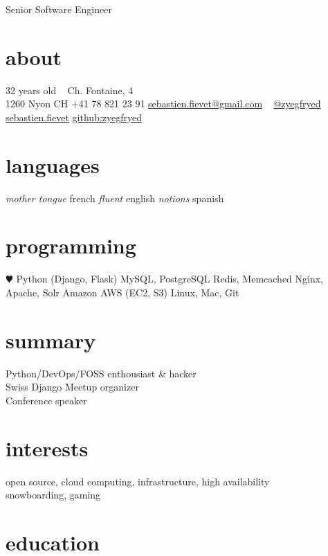 \documentclass[]{friggeri-cv}
\begin{document}
       {Senior Software Engineer}


\begin{aside}
  \section{about}
    {\FA \faUser} 32 years old
    ~
    {\FA \faHome} Ch. Fontaine, 4\\1260 Nyon CH
    {\FA \faPhone} +41 78 821 23 91
    {\FA \faEnvelope} \href{mailto:sebastien.fievet@gmail.com}{sebastien.fievet@gmail.com}
    ~
    \href{https://twitter.com/zyegfryed}{{\FA \faTwitter} @zyegfryed}
    \href{http://www.linkedin.com/in/sebastienfievet}{{\FA \faLinkedin} sebastien.fievet}
    \href{https://github.com/zyegfryed}{{\FA \faGithub} github:zyegfryed}
  \section{languages}
    \emph{mother tongue} french
    \emph{fluent} english
    \emph{notions} spanish
  \section{programming}
    {\color{red} $\varheartsuit$} Python
    (Django, Flask)
    MySQL, PostgreSQL
    Redis, Memcached
    Nginx, Apache, Solr
    Amazon AWS (EC2, S3)
    Linux, Mac, Git
\end{aside}

\section{summary}

Python/DevOps/FOSS enthousiast \& hacker\\
Swiss Django Meetup organizer\\
Conference speaker

\section{interests}

open source, cloud computing, infrastructure, high availability\\
snowboarding, gaming

\section{education}
\end{document}

